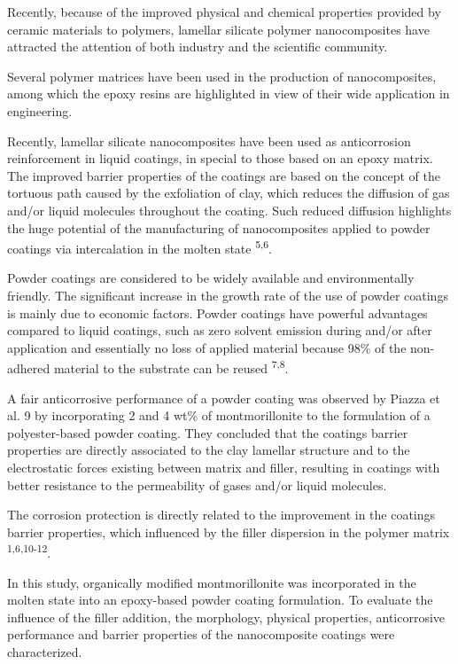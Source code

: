 \begin{multicols}{2}
\par{}Recently, because of the improved physical and chemical properties provided by ceramic materials to polymers, lamellar silicate polymer nanocomposites have attracted the attention of both industry and the scientific community.
\par{}Several polymer matrices have been used in the production of nanocomposites, among which the epoxy resins are highlighted in view of their wide application in engineering.
\par{}Recently, lamellar silicate nanocomposites have been used
as anticorrosion reinforcement in liquid coatings, in special
to those based on an epoxy matrix. The improved barrier
properties of the coatings are based on the concept of the
tortuous path caused by the exfoliation of clay, which reduces
the diffusion of gas and/or liquid molecules throughout the
coating. Such reduced diffusion highlights the huge potential
of the manufacturing of nanocomposites applied to powder
coatings via intercalation in the molten state \textsuperscript{5,6}.
\par{}Powder coatings are considered to be widely available
and environmentally friendly. The significant increase in the
growth rate of the use of powder coatings is mainly due to
economic factors. Powder coatings have powerful advantages
compared to liquid coatings, such as zero solvent emission
during and/or after application and essentially no loss of
applied material because 98\% of the non-adhered material
to the substrate can be reused \textsuperscript{7,8}.
\par{}A fair anticorrosive performance of a powder coating was
observed by Piazza et al. 9 by incorporating 2 and 4 wt\% of
montmorillonite to the formulation of a polyester-based
powder coating. They concluded that the coatings barrier
properties are directly associated to the clay lamellar structure
and to the electrostatic forces existing between matrix and
filler, resulting in coatings with better resistance to the
permeability of gases and/or liquid molecules.
\par{}The corrosion protection is directly related to the
improvement in the coatings barrier properties, which influenced by the filler dispersion in the polymer matrix \textsuperscript{1,6,10-12}.
\par{}In this study, organically modified montmorillonite was
incorporated in the molten state into an epoxy-based powder
coating formulation. To evaluate the influence of the filler
addition, the morphology, physical properties, anticorrosive
performance and barrier properties of the nanocomposite
coatings were characterized.


\end{multicols}
